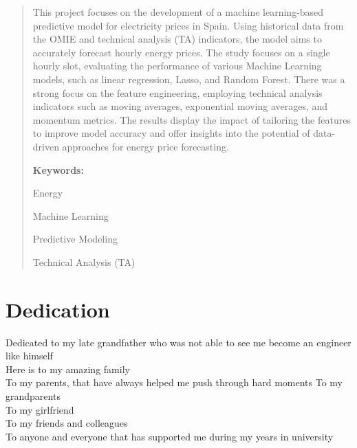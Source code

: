 \documentclass[12pt]{report} %
\begin{document}
\renewcommand\abstractname{\large\bfseries\filcenter\uppercase{Summary}}
\begin{abstract}
\thispagestyle{plain}
\setcounter{page}{3}
	
    This project focuses on the development of a machine learning-based predictive model for electricity prices in Spain. Using historical data from the OMIE and technical analysis (TA) indicators, the model aims to accurately forecast hourly energy prices. The study focuses on a single hourly slot, evaluating the performance of various Machine Learning models, such as linear regression, Lasso, and Random Forest. There was a strong focus on the feature engineering, employing technical analysis indicators such as moving averages, exponential moving averages, and momentum metrics. The results display the impact of tailoring the features to improve model accuracy and offer insights into the potential of data-driven approaches for energy price forecasting.
	
	\textbf{Keywords:} %
            
            Energy
            
            Machine Learning
            
            Predictive Modeling

            Technical Analysis (TA)
            
	
	\vfill
\end{abstract}
\newpage %
\thispagestyle{empty}
\mbox{}


\chapter*{Dedication}

\setcounter{page}{5}

\noindent Dedicated to my late grandfather who was not able to see me become an engineer like himself\\
Here is to my amazing family\\
To my parents, that have always helped me push through hard moments
To my grandparents\\
To my girlfriend\\
To my friends and colleagues\\
To anyone and everyone that has supported me during my years in university\\
\end{document}
